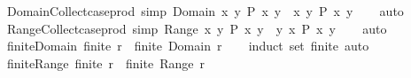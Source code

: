 \begin{isabellebody}
\endisatagproof
{\isafoldproof}%
%
\isadelimproof
\isanewline
%
\endisadelimproof
\isanewline
{}\isamarkupfalse%
\ Domain{\isacharunderscore}{\kern0pt}Collect{\isacharunderscore}{\kern0pt}case{\isacharunderscore}{\kern0pt}prod\ {\isacharbrackleft}{\kern0pt}simp{\isacharbrackright}{\kern0pt}{\isacharcolon}{\kern0pt}\ {\isachardoublequoteopen}Domain\ {\isacharbraceleft}{\kern0pt}{\isacharparenleft}{\kern0pt}x{\isacharcomma}{\kern0pt}\ y{\isacharparenright}{\kern0pt}{\isachardot}{\kern0pt}\ P\ x\ y{\isacharbraceright}{\kern0pt}\ {\isacharequal}{\kern0pt}\ {\isacharbraceleft}{\kern0pt}x{\isachardot}{\kern0pt}\ {\isasymexists}y{\isachardot}{\kern0pt}\ P\ x\ y{\isacharbraceright}{\kern0pt}{\isachardoublequoteclose}\isanewline
%
\isadelimproof
\ \ %
\endisadelimproof
%
\isatagproof
{}\isamarkupfalse%
\ auto%
\endisatagproof
{\isafoldproof}%
%
\isadelimproof
\isanewline
%
\endisadelimproof
\isanewline
{}\isamarkupfalse%
\ Range{\isacharunderscore}{\kern0pt}Collect{\isacharunderscore}{\kern0pt}case{\isacharunderscore}{\kern0pt}prod\ {\isacharbrackleft}{\kern0pt}simp{\isacharbrackright}{\kern0pt}{\isacharcolon}{\kern0pt}\ {\isachardoublequoteopen}Range\ {\isacharbraceleft}{\kern0pt}{\isacharparenleft}{\kern0pt}x{\isacharcomma}{\kern0pt}\ y{\isacharparenright}{\kern0pt}{\isachardot}{\kern0pt}\ P\ x\ y{\isacharbraceright}{\kern0pt}\ {\isacharequal}{\kern0pt}\ {\isacharbraceleft}{\kern0pt}y{\isachardot}{\kern0pt}\ {\isasymexists}x{\isachardot}{\kern0pt}\ P\ x\ y{\isacharbraceright}{\kern0pt}{\isachardoublequoteclose}\isanewline
%
\isadelimproof
\ \ %
\endisadelimproof
%
\isatagproof
{}\isamarkupfalse%
\ auto%
\endisatagproof
{\isafoldproof}%
%
\isadelimproof
\isanewline
%
\endisadelimproof
\isanewline
{}\isamarkupfalse%
\ finite{\isacharunderscore}{\kern0pt}Domain{\isacharcolon}{\kern0pt}\ {\isachardoublequoteopen}finite\ r\ {\isasymLongrightarrow}\ finite\ {\isacharparenleft}{\kern0pt}Domain\ r{\isacharparenright}{\kern0pt}{\isachardoublequoteclose}\isanewline
%
\isadelimproof
\ \ %
\endisadelimproof
%
\isatagproof
{}\isamarkupfalse%
\ {\isacharparenleft}{\kern0pt}induct\ set{\isacharcolon}{\kern0pt}\ finite{\isacharparenright}{\kern0pt}\ auto%
\endisatagproof
{\isafoldproof}%
%
\isadelimproof
\isanewline
%
\endisadelimproof
\isanewline
{}\isamarkupfalse%
\ finite{\isacharunderscore}{\kern0pt}Range{\isacharcolon}{\kern0pt}\ {\isachardoublequoteopen}finite\ r\ {\isasymLongrightarrow}\ finite\ {\isacharparenleft}{\kern0pt}Range\ r{\isacharparenright}{\kern0pt}{\isachardoublequoteclose}\isanewline

\end{isabellebody}
